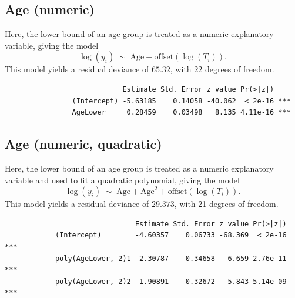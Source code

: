 \documentclass[10pt]{article}
\begin{document}
    \subsection{Age (numeric)}

    Here, the lower bound of an age group is treated as a numeric explanatory
    variable, giving the model \[
        \log(y_i) \;\sim\; \text{Age} + \text{offset}(\log(T_i)). \tag{iii}
    \] This model yields a residual deviance of $65.32$, with 22 degrees of freedom.

    \begin{verbatim}
                            Estimate Std. Error z value Pr(>|z|)    
                (Intercept) -5.63185    0.14058 -40.062  < 2e-16 ***
                AgeLower     0.28459    0.03498   8.135 4.11e-16 ***
    \end{verbatim}


    \subsection{Age (numeric, quadratic)}

    Here, the lower bound of an age group is treated as a numeric explanatory
    variable and used to fit a quadratic polynomial, giving the model \[
        \log(y_i) \;\sim\; \text{Age} + \text{Age}^2 + \text{offset}(\log(T_i)).
        \tag{iv}
    \] This model yields a residual deviance of $29.373$, with 21 degrees of freedom.

    \begin{verbatim}
                               Estimate Std. Error z value Pr(>|z|)    
            (Intercept)        -4.60357    0.06733 -68.369  < 2e-16 ***
            poly(AgeLower, 2)1  2.30787    0.34658   6.659 2.76e-11 ***
            poly(AgeLower, 2)2 -1.90891    0.32672  -5.843 5.14e-09 ***
    \end{verbatim}
\end{document}

